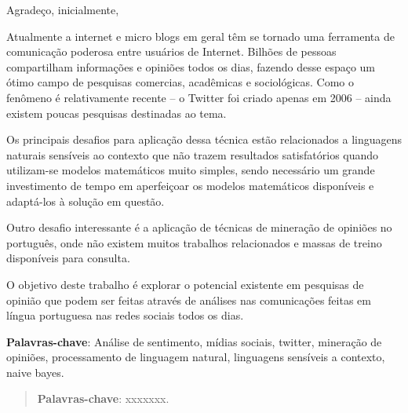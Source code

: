 \hspace{5mm}
Agradeço, inicialmente, 

\begin{resumo}

Atualmente a internet e micro blogs em geral têm se tornado uma ferramenta de comunicação poderosa entre usuários de Internet. Bilhões de pessoas compartilham informações e opiniões todos os dias, fazendo desse espaço um ótimo campo de pesquisas comercias, acadêmicas e sociológicas.  Como o fenômeno é relativamente recente – o Twitter foi criado apenas em 2006 – ainda existem poucas pesquisas destinadas ao tema.

Os principais desafios para aplicação dessa técnica estão relacionados a linguagens naturais sensíveis ao contexto que não trazem resultados satisfatórios quando utilizam-se modelos matemáticos muito simples, sendo necessário um grande investimento de tempo em aperfeiçoar os modelos matemáticos disponíveis e adaptá-los à solução em questão.

Outro desafio interessante é a aplicação de técnicas de mineração de opiniões no português, onde não existem muitos trabalhos relacionados e massas de treino disponíveis para consulta.

O objetivo deste trabalho é explorar o potencial existente em pesquisas de opinião que podem ser feitas através de análises nas comunicações feitas em língua portuguesa nas redes sociais todos os dias.

{\hspace{-8mm} \bf{Palavras-chave}}: Análise de sentimento, mídias sociais, twitter, mineração de opiniões, processamento de linguagem natural, linguagens sensíveis a contexto, naive bayes.

\acresetall

\end{resumo}

\begin{abstract}


{\hspace{-8mm} \bf{Palavras-chave}}: xxxxxxx.


\acresetall

\end{abstract}

